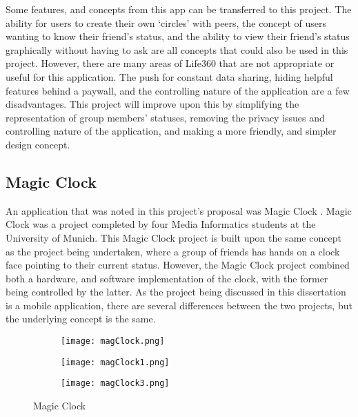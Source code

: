 Some features, and concepts from this app can be transferred to this project. The ability for users to create their own `circles' with peers, the concept of users wanting to know their friend's status, and the ability to view their friend's status graphically without having to ask are all concepts that could also be used in this project. However, there are many areas of Life360 that are not appropriate or useful for this application. The push for constant data sharing, hiding helpful features behind a paywall, and the controlling nature of the application are a few disadvantages. This project will improve upon this by simplifying the representation of group members' statuses, removing the privacy issues and controlling nature of the application, and making a more friendly, and simpler design concept. 

\subsection{Magic Clock}

An application that was noted in this project's proposal was Magic Clock \cite{magicClock}. Magic Clock was a project completed by four Media Informatics students at the University of Munich. This Magic Clock project is built upon the same concept as the project being undertaken, where a group of friends has hands on a clock face pointing to their current status. However, the Magic Clock project combined both a hardware, and software implementation of the clock, with the former being controlled by the latter. As the project being discussed in this dissertation is a mobile application, there are several differences between the two projects, but the underlying concept is the same. 

\begin{figure}[!htbp]
    \centering
    \begin{subfigure}[b]{0.22\textwidth}
        \texttt{[image: magClock.png]}
    \end{subfigure}
    \hspace{1.5em}
    \begin{subfigure}[b]{0.22\textwidth}
        \texttt{[image: magClock1.png]}
    \end{subfigure}
    \hspace{1.5em}
    \begin{subfigure}[b]{0.22\textwidth}
        \texttt{[image: magClock3.png]}
    \end{subfigure}
    \caption{Magic Clock}
    \label{fig:magClock}
\end{figure}
\FloatBarrier

